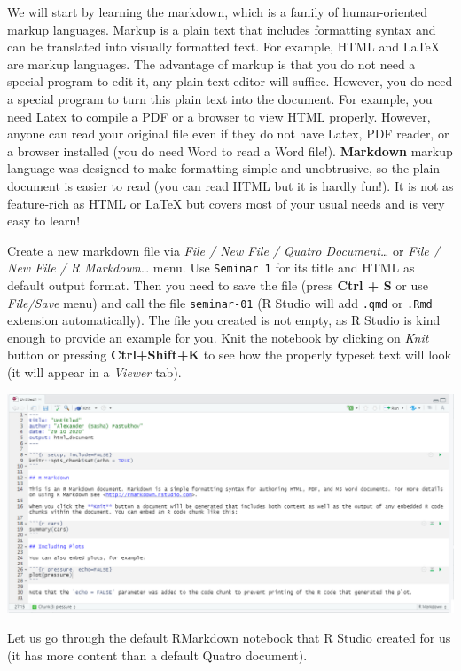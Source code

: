 \documentclass[
]{book}
\begin{document}
We will start by learning the markdown, which is a family of human-oriented markup languages. Markup is a plain text that includes formatting syntax and can be translated into visually formatted text. For example, HTML and LaTeX are markup languages. The advantage of markup is that you do not need a special program to edit it, any plain text editor will suffice. However, you do need a special program to turn this plain text into the document. For example, you need Latex to compile a PDF or a browser to view HTML properly. However, anyone can read your original file even if they do not have Latex, PDF reader, or a browser installed (you do need Word to read a Word file!). \textbf{Markdown} markup language was designed to make formatting simple and unobtrusive, so the plain document is easier to read (you can read HTML but it is hardly fun!). It is not as feature-rich as HTML or LaTeX but covers most of your usual needs and is very easy to learn!

Create a new markdown file via \emph{File / New File / Quatro Document\ldots{}} or \emph{File / New File / R Markdown\ldots{}} menu. Use \texttt{Seminar\ 1} for its title and HTML as default output format. Then you need to save the file (press \textbf{Ctrl + S} or use \emph{File/Save} menu) and call the file \texttt{seminar-01} (R Studio will add \texttt{.qmd} or \texttt{.Rmd} extension automatically). The file you created is not empty, as R Studio is kind enough to provide an example for you. Knit the notebook by clicking on \emph{Knit} button or pressing \textbf{Ctrl+Shift+K} to see how the properly typeset text will look (it will appear in a \emph{Viewer} tab).

\begin{center}\includegraphics[width=1\linewidth]{images/default-notebook} \end{center}

Let us go through the default RMarkdown notebook that R Studio created for us (it has more content than a default Quatro document).
\end{document}
